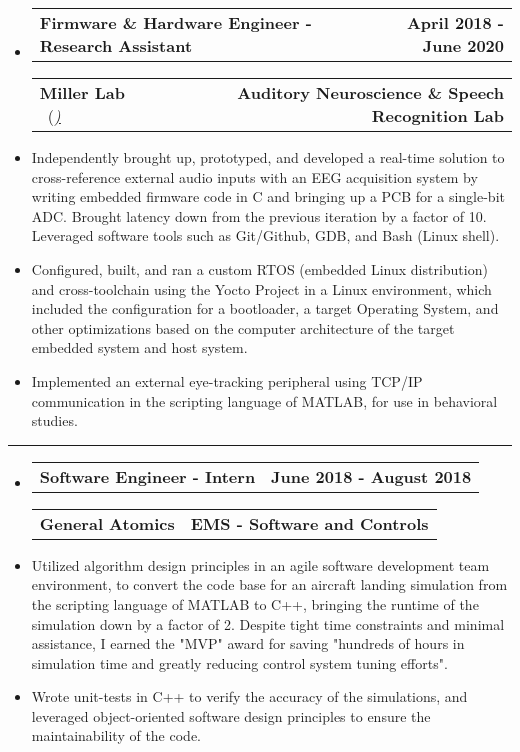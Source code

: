 \documentclass[10pt,letterpaper]{article}
\makeatletter
\newcommand{\header}[2]
{
	\begin{tabular*}{\linewidth}{l @{\extracolsep{\fill}} r}
		\hspace{-27pt} #1 & #2 \\
	\end{tabular*}
}
\makeatother
\begin{document}
\begin{itemize}
	\item[]
		\header
		{\textbf{Firmware \& Hardware Engineer - Research Assistant}} 
		{\textbf{April 2018 - June 2020}}
		\header
		{\textbf{Miller Lab} \ (\href{https://millerlab.faculty.ucdavis.edu}{\small \emph{\underline{\smash{millerlab.faculty.ucdavis.edu})}}} }
		{\textbf{Auditory Neuroscience \& Speech Recognition Lab}} 
	\item
		Independently brought up, prototyped, and developed a real-time solution to cross-reference external audio inputs with an EEG acquisition system by writing embedded firmware code in C and bringing up a PCB for a single-bit ADC. Brought latency down from the previous iteration by a factor of 10. Leveraged software tools such as Git/Github, GDB, and Bash (Linux shell).
	\item 
		Configured, built, and ran a custom RTOS (embedded Linux distribution) and cross-toolchain using the Yocto Project in a Linux environment, which included the configuration for a bootloader, a target Operating System, and other optimizations based on the computer architecture of the target embedded system and host system.
	\item 
		Implemented an external eye-tracking peripheral using TCP/IP communication in the scripting language of MATLAB, for use in behavioral studies.
\end{itemize}

\hrule

\begin{itemize}
	\item[]
		\header
		{\textbf{Software Engineer - Intern}} 
		{\textbf{June 2018 - August 2018}}
		\header
		{\textbf{General Atomics}}
		{\textbf{EMS - Software and Controls}} 
	\item
		Utilized algorithm design principles in an agile software development team environment, to convert the code base for an aircraft landing simulation from the scripting language of MATLAB to C++, bringing the runtime of the simulation down by a factor of 2. Despite tight time constraints and minimal assistance, I earned the "MVP" award for saving "hundreds of hours in simulation time and greatly reducing control system tuning efforts".
	\item
		Wrote unit-tests in C++ to verify the accuracy of the simulations, and leveraged object-oriented software design principles to ensure the maintainability of the code.


\end{itemize}
\end{document}

